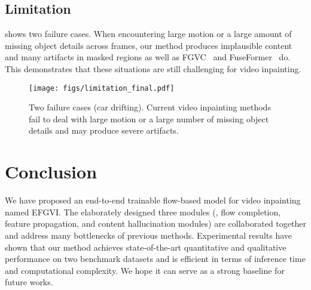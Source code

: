 \documentclass[final]{cvpr}
\newcommand{\methodname}{EFGVI}
\begin{document}
\begin{table}
    \begin{center}
        \caption{\label{tab:att-ablation}Ablation study on various attention mechanisms.
        FuseFormer~\cite{Liu_2021_FuseFormer} is the current SOTA method that uses vanilla global attention.}
        \renewcommand{\arraystretch}{1.2}
        \renewcommand{\tabcolsep}{1.3mm}
    \end{center}
    \vspace{-6mm}
\end{table}

\vspace{-1mm}
\subsection{Limitation}
\vspace{-1mm}
 shows two failure cases.
When encountering large motion or a large amount of missing object details across frames, our method produces implausible content and many artifacts in masked regions as well as FGVC~\cite{Gao-ECCV-FGVC} and FuseFormer~\cite{Liu_2021_FuseFormer} do.
This demonstrates that these situations are still challenging for video inpainting.
\vspace{-3mm}

\begin{figure}[t]
    \centering
    \texttt{[image: figs/limitation\_final.pdf]}
    \caption{Two failure cases (car drifting).
        Current video inpainting methods fail to deal with large motion or a large number of missing object details and may produce severe artifacts.}
    \label{fig:limitation}
    \vspace{-5mm}
\end{figure} \section{Conclusion}
\vspace{-1mm}
We have proposed an end-to-end trainable flow-based model for video inpainting named \methodname.
The elaborately designed three modules (\ie, flow completion, feature propagation, and content hallucination modules) are collaborated together and address many bottlenecks of previous methods.
Experimental results have shown that our method achieves state-of-the-art quantitative and qualitative performance on two benchmark datasets and is efficient in terms of inference time and computational complexity.
We hope it can serve as a strong baseline for future works.
\end{document}

